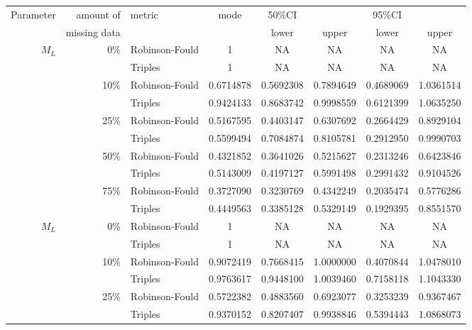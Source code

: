\begin{tabular}{rrlccccc}
    \hline
    Parameter & amount of    & metric & mode & 50\%CI &       & 95\%CI &       \\
              & missing data &        &      & lower  & upper & lower  & upper \\
    \hline
    $M_L$     & 0\%          & Robinson-Fould & 1 & NA  & NA & NA  & NA \\
              &              & Triples        & 1 & NA  & NA & NA  & NA \\
              & 10\%         & Robinson-Fould & 0.6714878 & 0.5692308  & 0.7894649 & 0.4689069  & 1.0361514 \\ %
              &              & Triples        & 0.9424133 & 0.8683742  & 0.9998559 & 0.6121399  & 1.0635250 \\
              & 25\%         & Robinson-Fould & 0.5167595 & 0.4403147  & 0.6307692 & 0.2664429  & 0.8929104 \\
              &              & Triples        & 0.5599494 & 0.7084874  & 0.8105781 & 0.2912950  & 0.9990703 \\
              & 50\%         & Robinson-Fould & 0.4321852 & 0.3641026  & 0.5215627 & 0.2313246  & 0.6423846 \\
              &              & Triples        & 0.5143009 & 0.4197127  & 0.5991498 & 0.2991432  & 0.9104526 \\
              & 75\%         & Robinson-Fould & 0.3727090 & 0.3230769  & 0.4342249 & 0.2035474  & 0.5776286 \\
              &              & Triples        & 0.4449563 & 0.3385128  & 0.5329149 & 0.1929395  & 0.8551570 \\
    $M_L$     & 0\%          & Robinson-Fould & 1 & NA  & NA & NA  & NA \\
              &              & Triples        & 1 & NA  & NA & NA  & NA \\
              & 10\%         & Robinson-Fould & 0.9072419 & 0.7668415  & 1.0000000 & 0.4070844  & 1.0478010 \\
              &              & Triples        & 0.9763617 & 0.9448100  & 1.0039460 & 0.7158118  & 1.1043330 \\
              & 25\%         & Robinson-Fould & 0.5722382 & 0.4883560  & 0.6923077 & 0.3253239  & 0.9367467 \\
              &              & Triples        & 0.9370152 & 0.8207407  & 0.9938846 & 0.5394443  & 1.0868073 \\

\end{tabular}

